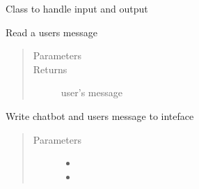 \documentclass[letterpaper,10pt,english]{sphinxmanual}
\begin{document}
\begin{fulllineitems}
\label{\detokenize{index:Fralysis.InputOutput.InputOutput}}
Class to handle input and output

\begin{fulllineitems}
\label{\detokenize{index:Fralysis.InputOutput.InputOutput.read_message}}
Read a users message
\begin{quote}\begin{description}
\item[{Parameters}] \leavevmode
{} \textendash{} 

\item[{Returns}] \leavevmode
user’s message

\end{description}\end{quote}

\end{fulllineitems}


\begin{fulllineitems}
\label{\detokenize{index:Fralysis.InputOutput.InputOutput.write_message}}
Write chatbot and users message to inteface
\begin{quote}\begin{description}
\item[{Parameters}] \leavevmode\begin{itemize}
\item {} 
 \textendash{} 

\item {} 
 \textendash{} 

\end{itemize}

\end{description}\end{quote}

\end{fulllineitems}


\end{fulllineitems}
\end{document}
